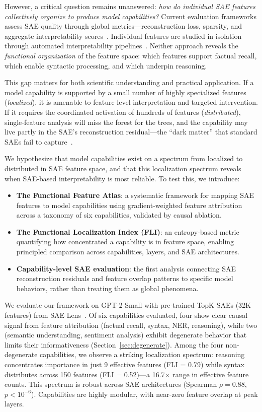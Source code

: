 \documentclass{article}
\begin{document}
However, a critical question remains unanswered: \emph{how do individual SAE features collectively organize to produce model capabilities?} Current evaluation frameworks assess SAE quality through global metrics---reconstruction loss, sparsity, and aggregate interpretability scores~\citep{gao2024scaling,karvonen2025saebench}. Individual features are studied in isolation through automated interpretability pipelines~\citep{bills2023language}. Neither approach reveals the \emph{functional organization} of the feature space: which features support factual recall, which enable syntactic processing, and which underpin reasoning.

This gap matters for both scientific understanding and practical application. If a model capability is supported by a small number of highly specialized features (\emph{localized}), it is amenable to feature-level interpretation and targeted intervention. If it requires the coordinated activation of hundreds of features (\emph{distributed}), single-feature analysis will miss the forest for the trees, and the capability may live partly in the SAE's reconstruction residual---the ``dark matter'' that standard SAEs fail to capture~\citep{engels2025decomposing}.

We hypothesize that model capabilities exist on a spectrum from localized to distributed in SAE feature space, and that this localization spectrum reveals when SAE-based interpretability is most reliable. To test this, we introduce:

\begin{itemize}
    \item \textbf{The Functional Feature Atlas}: a systematic framework for mapping SAE features to model capabilities using gradient-weighted feature attribution across a taxonomy of six capabilities, validated by causal ablation.
    \item \textbf{The Functional Localization Index (FLI)}: an entropy-based metric quantifying how concentrated a capability is in feature space, enabling principled comparison across capabilities, layers, and SAE architectures.
    \item \textbf{Capability-level SAE evaluation}: the first analysis connecting SAE reconstruction residuals and feature overlap patterns to specific model behaviors, rather than treating them as global phenomena.
\end{itemize}

We evaluate our framework on GPT-2 Small with pre-trained TopK SAEs (32K features) from SAE Lens~\citep{bloom2024sae}. Of six capabilities evaluated, four show clear causal signal from feature attribution (factual recall, syntax, NER, reasoning), while two (semantic understanding, sentiment analysis) exhibit degenerate behavior that limits their informativeness (Section~\ref{sec:degenerate}). Among the four non-degenerate capabilities, we observe a striking localization spectrum: reasoning concentrates importance in just 9 effective features (FLI = 0.79) while syntax distributes across 150 features (FLI = 0.52)---a 16.7$\times$ range in effective feature counts. This spectrum is robust across SAE architectures (Spearman $\rho = 0.88$, $p < 10^{-6}$). Capabilities are highly modular, with near-zero feature overlap at peak layers.
\end{document}
